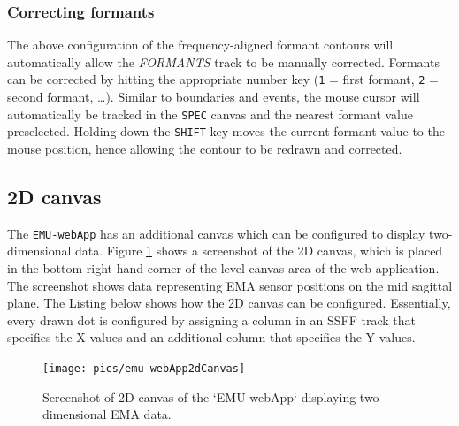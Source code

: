 \documentclass[]{book}
\begin{document}
\hypertarget{correcting-formants}{%
\subsubsection*{Correcting formants}\label{correcting-formants}}

The above configuration of the frequency-aligned formant contours will automatically allow the \emph{FORMANTS} track to be manually corrected. Formants can be corrected by hitting the appropriate number key (\texttt{1} = first formant, \texttt{2} = second formant, \ldots{}). Similar to boundaries and events, the mouse cursor will automatically be tracked in the \texttt{SPEC} canvas and the nearest formant value preselected. Holding down the \texttt{SHIFT} key moves the current formant value to the mouse position, hence allowing the contour to be redrawn and corrected.

\hypertarget{d-canvas}{%
\subsection{2D canvas}\label{d-canvas}}

The \texttt{EMU-webApp} has an additional canvas which can be configured to display two-dimensional data. Figure \ref{fig:webApp-2dCanvas} shows a screenshot of the 2D canvas, which is placed in the bottom right hand corner of the level canvas area of the web application. The screenshot shows data representing EMA sensor positions on the mid sagittal plane. The Listing below shows how the 2D canvas can be configured. Essentially, every drawn dot is configured by assigning a column in an SSFF track that specifies the X values and an additional column that specifies the Y values.

\begin{figure}

{\centering \texttt{[image: pics/emu-webApp2dCanvas]} 

}

\caption{Screenshot of 2D canvas of the `EMU-webApp` displaying two-dimensional EMA data.}\label{fig:webApp-2dCanvas}
\end{figure}
\end{document}
